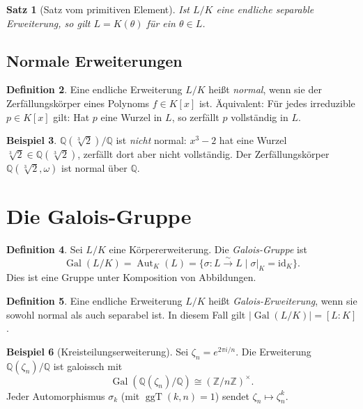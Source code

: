 \documentclass[12pt,a4paper]{amsart}
\newtheorem{theorem}{Satz}[section]
\theoremstyle{definition}
\newtheorem{definition}[theorem]{Definition}
\newtheorem{beispiel}[theorem]{Beispiel}
\newcommand{\Q}{\mathbb{Q}}
\newcommand{\Z}{\mathbb{Z}}
\newcommand{\Gal}{\operatorname{Gal}}
\newcommand{\Aut}{\operatorname{Aut}}
\newcommand{\ggT}{\operatorname{ggT}}
\begin{document}
\begin{theorem}[Satz vom primitiven Element]
Ist $L/K$ eine endliche separable Erweiterung, so gilt $L = K(\theta)$ für
ein $\theta \in L$.
\end{theorem}

\subsection{Normale Erweiterungen}

\begin{definition}
Eine endliche Erweiterung $L/K$ heißt \emph{normal}, wenn sie der
Zerfällungskörper eines Polynoms $f \in K[x]$ ist. Äquivalent: Für jedes
irreduzible $p \in K[x]$ gilt: Hat $p$ eine Wurzel in $L$, so zerfällt $p$
vollständig in $L$.
\end{definition}

\begin{beispiel}
$\Q(\sqrt[3]{2})/\Q$ ist \emph{nicht} normal: $x^3 - 2$ hat eine Wurzel
$\sqrt[3]{2} \in \Q(\sqrt[3]{2})$, zerfällt dort aber nicht vollständig.
Der Zerfällungskörper $\Q(\sqrt[3]{2},\omega)$ ist normal über $\Q$.
\end{beispiel}

\section{Die Galois-Gruppe}
\label{sec:galoisgruppe}

\begin{definition}
Sei $L/K$ eine Körpererweiterung. Die \emph{Galois-Gruppe} ist
\[
  \Gal(L/K) = \Aut_K(L) = \{\sigma: L \xrightarrow{\sim} L \mid \sigma|_K = \mathrm{id}_K\}.
\]
Dies ist eine Gruppe unter Komposition von Abbildungen.
\end{definition}

\begin{definition}
Eine endliche Erweiterung $L/K$ heißt \emph{Galois-Erweiterung}, wenn sie
sowohl normal als auch separabel ist. In diesem Fall gilt $|\Gal(L/K)| = [L:K]$.
\end{definition}

\begin{beispiel}[Kreisteilungserweiterung]
Sei $\zeta_n = e^{2\pi i/n}$. Die Erweiterung $\Q(\zeta_n)/\Q$ ist galoissch
mit
\[
  \Gal(\Q(\zeta_n)/\Q) \cong (\Z/n\Z)^\times.
\]
Jeder Automorphismus $\sigma_k$ (mit $\ggT(k,n)=1$) sendet $\zeta_n \mapsto \zeta_n^k$.
\end{beispiel}
\end{document}
